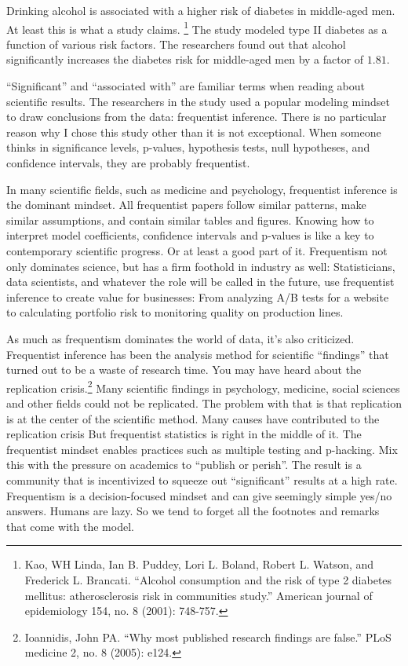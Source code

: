 \documentclass[
  10pt,
]{scrbook}
\begin{document}
Drinking alcohol is associated with a higher risk of diabetes in middle-aged men.
At least this is what a study claims. \footnote{Kao, WH Linda, Ian B. Puddey, Lori L. Boland, Robert L. Watson, and Frederick L. Brancati. ``Alcohol consumption and the risk of type 2 diabetes mellitus: atherosclerosis risk in communities study.'' American journal of epidemiology 154, no. 8 (2001): 748-757.}
The study modeled type II diabetes as a function of various risk factors.
The researchers found out that alcohol significantly increases the diabetes risk for middle-aged men by a factor of \(1.81\).

``Significant'' and ``associated with'' are familiar terms when reading about scientific results.
The researchers in the study used a popular modeling mindset to draw conclusions from the data: frequentist inference.
There is no particular reason why I chose this study other than it is not exceptional.
When someone thinks in significance levels, p-values, hypothesis tests, null hypotheses, and confidence intervals, they are probably frequentist.

In many scientific fields, such as medicine and psychology, frequentist inference is the dominant mindset.
All frequentist papers follow similar patterns, make similar assumptions, and contain similar tables and figures.
Knowing how to interpret model coefficients, confidence intervals and p-values is like a key to contemporary scientific progress.
Or at least a good part of it.
Frequentism not only dominates science, but has a firm foothold in industry as well:
Statisticians, data scientists, and whatever the role will be called in the future, use frequentist inference to create value for businesses:
From analyzing A/B tests for a website to calculating portfolio risk to monitoring quality on production lines.

As much as frequentism dominates the world of data, it's also criticized.
Frequentist inference has been the analysis method for scientific ``findings'' that turned out to be a waste of research time.
You may have heard about the replication crisis.\footnote{Ioannidis, John PA. ``Why most published research findings are false.'' PLoS medicine 2, no. 8 (2005): e124.}
Many scientific findings in psychology, medicine, social sciences and other fields could not be replicated.
The problem with that is that replication is at the center of the scientific method.
Many causes have contributed to the replication crisis
But frequentist statistics is right in the middle of it.
The frequentist mindset enables practices such as multiple testing and p-hacking.
Mix this with the pressure on academics to ``publish or perish''.
The result is a community that is incentivized to squeeze out ``significant'' results at a high rate.
Frequentism is a decision-focused mindset and can give seemingly simple yes/no answers.
Humans are lazy.
So we tend to forget all the footnotes and remarks that come with the model.
\end{document}
